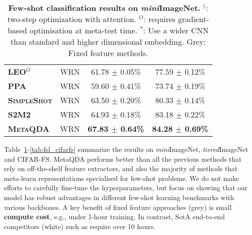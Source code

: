 \documentclass[10pt,twocolumn,letterpaper]{article}
\def\tierIN{\textit{tiered}ImageNet}
\def\miniIN{\textit{mini}ImageNet}
\begin{document}
\begin{table}[h]
{\begin{tabular}{@{} llcc @{}}
\midrule 

\textbf{\textsc{LEO}}$^{O}$ \cite{rusu2019leo} & WRN & 61.78 $\pm$ 0.05\% & 77.59 $\pm$ 0.12\% \\
\rowcolor{Gray} \textbf{\textsc{PPA}} \cite{qiao2017few} & WRN & 59.60 $\pm$ 0.41\% & 73.74 $\pm$ 0.19\% \\ 
\rowcolor{Gray} \textbf{\textsc{SimpleShot}}\cite{wang2019simpleshot} & WRN & {63.50 $\pm$ 0.20\%} & {80.33 $\pm$ 0.14\%} \\
\rowcolor{Gray} \textbf{\textsc{S2M2}} \cite{mangla2020charting} & WRN & 64.93 $\pm$ 0.18\% & 83.18 $\pm$ 0.22\% \\
\rowcolor{Gray} \textbf{\textsc{MetaQDA}} & WRN & \textbf{67.83 $\pm$ 0.64\%} & \textbf{84.28 $\pm$ 0.69\%} \\ 

\bottomrule
\end{tabular}
}
\caption{\small \small
\textbf{Few-shot classification results on \miniIN{}.} 
$^\dagger$: two-step optimization with  attention. 
$^O$: requires gradient-based optimisation at meta-test time. $^*$: Use a wider CNN than standard and higher dimensional embedding. 
Grey: Fixed feature methods.}
\label{tab:fsl_mini}
\end{table}


Table~\ref{tab:fsl_mini}-\ref{tab:fsl_cifarfs} summarize the results on \miniIN{}, \tierIN{} and CIFAR-FS. MetaQDA performs better than all the previous methods that rely on off-the-shelf feature extractors, and also the majority of methods that meta-learn representations specialised for few-shot problems. We do not make efforts to carefully fine-tune the hyperparameters, but focus on showing that our model has robust advantages in different few-shot learning benchmarks with various backbones. A key benefit of fixed feature approaches (grey) is small \textbf{compute cost}, e.g., under 1-hour training. In contrast, SotA end-to-end competitors (white) such as \cite{lee2019meta,gidaris2018dynamic,xueting2020dcn} require over 10 hours.
\end{document}

